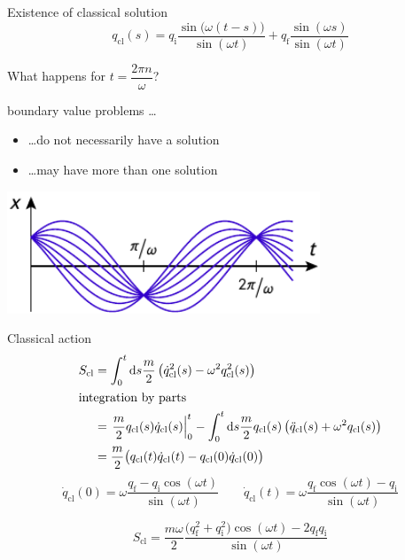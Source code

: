 \documentclass[t,dvipsnames]{beamer}
\begin{document}
\begin{frame}[t]{Existence of classical solution}
 \begin{displaymath}
   q_\text{cl}(s) = q_\text{i}\frac{\sin\big(\omega(t-s)\big)}{\sin(\omega t)}
		    + q_\text{f}\frac{\sin(\omega s)}{\sin(\omega t)}
 \end{displaymath}

 \vspace{0.3truecm}
 What happens for $t=\dfrac{2\pi n}{\omega}$?

 \vspace{0.3truecm}
 boundary value problems \ldots
 \begin{itemize}
  \item \ldots do not necessarily have a solution
  \item \ldots may have more than one solution
 \end{itemize}

 \begin{center}
  \includegraphics[width=0.7\textwidth]{ho_classical}
 \end{center}
\end{frame}

\begin{frame}[t]{Classical action}
 \begin{align}
  S_\text{cl} &= \int_0^t\text{d}s\frac{m}{2}\left(\dot q_\text{cl}^2(s)
	            -\omega^2q_\text{cl}^2(s)\right)\nonumber\\
  \intertext{integration by parts}
	      &= \left.\frac{m}{2}q_\text{cl}(s)\dot q_\text{cl}(s)\right\vert_0^t
		 -\int_0^t\text{d}s\frac{m}{2}q_\text{cl}(s)\left(\ddot q_\text{cl}(s)
			  +\omega^2q_\text{cl}(s)\right)\nonumber\\
	      &=\frac{m}{2}\big(q_\text{cl}(t)\dot q_\text{cl}(t)
	                 -q_\text{cl}(0)\dot q_\text{cl}(0)\big)\nonumber
 \end{align}
 \begin{displaymath}
  \dot q_\text{cl}(0) = \omega\frac{q_\text{f}-q_\text{i}\cos(\omega t)}{\sin(\omega t)}\qquad
  \dot q_\text{cl}(t) = \omega\frac{q_\text{f}\cos(\omega t)-q_\text{i}}{\sin(\omega t)}
 \end{displaymath}

 \vspace{0.3truecm}
 \begin{displaymath}
  S_\text{cl} = \frac{m\omega}{2}\frac{\big(q_\text{f}^2+q_\text{i}^2\big)\cos(\omega t)
	                               -2q_\text{f}q_\text{i}}{\sin(\omega t)}
 \end{displaymath}
\end{frame}
\end{document}
